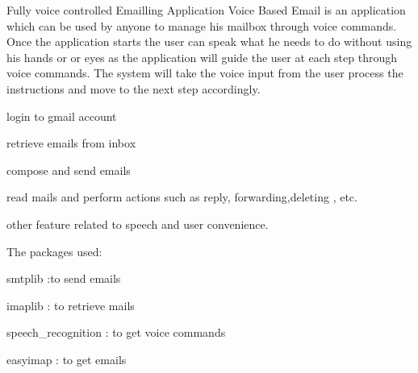 Fully voice controlled Emailling Application Voice Based Email is an application which can be used by anyone to manage his mailbox through voice commands. Once the application starts the user can speak what he needs to do without using his hands or or eyes as the application will guide the user at each step through voice commands. The system will take the voice input from the user process the instructions and move to the next step accordingly.
\begin{DoxyEnumerate}
\item login to gmail account
\item retrieve emails from inbox
\item compose and send emails
\item read mails and perform actions such as reply, forwarding,deleting , etc.
\item other feature related to speech and user convenience.
\end{DoxyEnumerate}

The packages used\+:
\begin{DoxyItemize}
\item smtplib \+:to send emails
\item imaplib \+: to retrieve mails
\item speech\+\_\+recognition \+: to get voice commands
\item easyimap \+: to get emails 
\end{DoxyItemize}